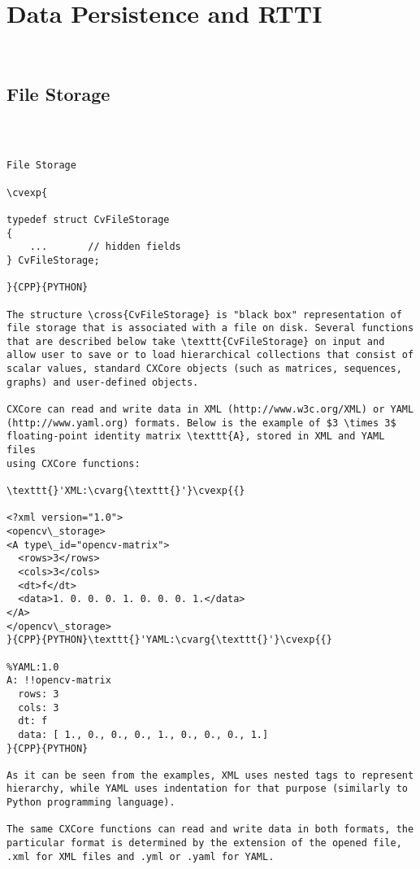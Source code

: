 \section{Data Persistence and RTTI}
\begin{verbatim}


\end{verbatim}
\subsection{File Storage}
\begin{verbatim}


\end{verbatim}
\label{CvFileStorage}
\begin{verbatim}

File Storage

\cvexp{

typedef struct CvFileStorage
{
    ...       // hidden fields
} CvFileStorage;

}{CPP}{PYTHON}

The structure \cross{CvFileStorage} is "black box" representation of file storage that is associated with a file on disk. Several functions that are described below take \texttt{CvFileStorage} on input and allow user to save or to load hierarchical collections that consist of scalar values, standard CXCore objects (such as matrices, sequences, graphs) and user-defined objects.

CXCore can read and write data in XML (http://www.w3c.org/XML) or YAML
(http://www.yaml.org) formats. Below is the example of $3 \times 3$
floating-point identity matrix \texttt{A}, stored in XML and YAML files
using CXCore functions:

\texttt{}'XML:\cvarg{\texttt{}'}\cvexp{{}

<?xml version="1.0">
<opencv\_storage>
<A type\_id="opencv-matrix">
  <rows>3</rows>
  <cols>3</cols>
  <dt>f</dt>
  <data>1. 0. 0. 0. 1. 0. 0. 0. 1.</data>
</A>
</opencv\_storage>
}{CPP}{PYTHON}\texttt{}'YAML:\cvarg{\texttt{}'}\cvexp{{}

%YAML:1.0
A: !!opencv-matrix
  rows: 3
  cols: 3
  dt: f
  data: [ 1., 0., 0., 0., 1., 0., 0., 0., 1.]
}{CPP}{PYTHON}

As it can be seen from the examples, XML uses nested tags to represent hierarchy, while YAML uses indentation for that purpose (similarly to Python programming language).

The same CXCore functions can read and write data in both formats, the particular format is determined by the extension of the opened file, .xml for XML files and .yml or .yaml for YAML.


\end{verbatim}
